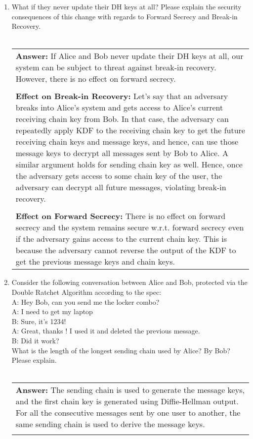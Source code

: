 \documentclass[11pt]{article}
\newenvironment{answer}
{\vspace{2mm}\begin{tabular}{|p{0.9\textwidth}|}
 \hline{\bf Answer:} }{\\ \hline\end{tabular}\vspace{1cm}}
\newenvironment{problems}
{\begin{enumerate}[label=\bfseries Question \arabic*.,align=left,leftmargin=1em,labelwidth=1.5em]}
{\end{enumerate}}
\begin{document}
\begin{problems}
\item What if they never update their DH keys at all? Please explain the security consequences of this change with regards to Forward Secrecy and Break-in Recovery.
\\ \\
\begin{answer}
If Alice and Bob never update their DH keys at all, our system can be subject to threat against break-in recovery. However, there is no effect on forward secrecy.
\\\\
\textbf{Effect on Break-in Recovery:} Let's say that an adversary breaks into Alice's system and gets access to Alice's current receiving chain key from Bob. In that case, the adversary can repeatedly apply KDF to the receiving chain key to get the future receiving chain keys and message keys, and hence, can use those message keys to decrypt all messages sent by Bob to Alice. A similar argument holds for sending chain key as well.
Hence, once the adversary gets access to some chain key of the user, the adversary can decrypt all future messages, violating break-in recovery.
\\\\
\textbf{Effect on Forward Secrecy:} There is no effect on forward secrecy and the system remains secure w.r.t. forward secrecy even if the adversary gains access to the current chain key. This is because the adversary cannot reverse the output of the KDF to get the previous message keys and chain keys.
\end{answer}
\item Consider the following conversation between Alice and Bob, protected via the Double Ratchet Algorithm according to the spec:\\
A: Hey Bob, can you send me the locker combo?\\
A: I need to get my laptop\\
B: Sure, it’s 1234!\\
A: Great, thanks ! I used it and deleted the previous message.\\
B: Did it work?\\
What is the length of the longest sending chain used by Alice? By Bob? Please explain.
\\ \\
\begin{answer}
The sending chain is used to generate the message keys, and the first chain key is generated using Diffie-Hellman output. For all the consecutive messages sent by one user to another, the same sending chain is used to derive the message keys. \\

\end{answer}
\end{problems}
\end{document}
